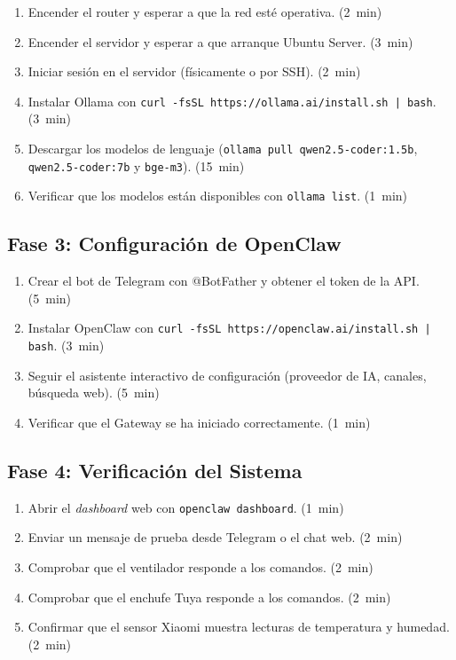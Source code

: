 \begin{enumerate}
    \item Encender el router y esperar a que la red esté operativa. \hfill (2~min)
    \item Encender el servidor y esperar a que arranque Ubuntu Server. \hfill (3~min)
    \item Iniciar sesión en el servidor (físicamente o por SSH). \hfill (2~min)
    \item Instalar Ollama con \texttt{curl -fsSL https://ollama.ai/install.sh | bash}. \hfill (3~min)
    \item Descargar los modelos de lenguaje (\texttt{ollama pull qwen2.5-coder:1.5b}, \texttt{qwen2.5-coder:7b} y \texttt{bge-m3}). \hfill (15~min)
    \item Verificar que los modelos están disponibles con \texttt{ollama list}. \hfill (1~min)
\end{enumerate}

\subsection{Fase 3: Configuración de OpenClaw}

\begin{enumerate}
    \item Crear el bot de Telegram con @BotFather y obtener el token de la API. \hfill (5~min)
    \item Instalar OpenClaw con \texttt{curl -fsSL https://openclaw.ai/install.sh | bash}. \hfill (3~min)
    \item Seguir el asistente interactivo de configuración (proveedor de IA, canales, búsqueda web). \hfill (5~min)
    \item Verificar que el Gateway se ha iniciado correctamente. \hfill (1~min)
\end{enumerate}

\subsection{Fase 4: Verificación del Sistema}

\begin{enumerate}
    \item Abrir el \textit{dashboard} web con \texttt{openclaw dashboard}. \hfill (1~min)
    \item Enviar un mensaje de prueba desde Telegram o el chat web. \hfill (2~min)
    \item Comprobar que el ventilador responde a los comandos. \hfill (2~min)
    \item Comprobar que el enchufe Tuya responde a los comandos. \hfill (2~min)
    \item Confirmar que el sensor Xiaomi muestra lecturas de temperatura y humedad. \hfill (2~min)
\end{enumerate}

